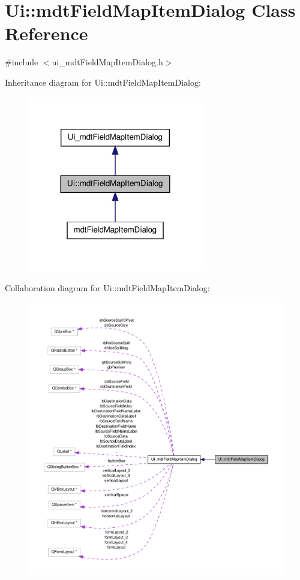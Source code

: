 \hypertarget{class_ui_1_1mdt_field_map_item_dialog}{\section{Ui\-:\-:mdt\-Field\-Map\-Item\-Dialog Class Reference}
\label{class_ui_1_1mdt_field_map_item_dialog}
}


{\ttfamily \#include $<$ui\-\_\-mdt\-Field\-Map\-Item\-Dialog.\-h$>$}



Inheritance diagram for Ui\-:\-:mdt\-Field\-Map\-Item\-Dialog\-:\nopagebreak
\begin{figure}[H]
\begin{center}
\leavevmode
\includegraphics[width=216pt]{class_ui_1_1mdt_field_map_item_dialog__inherit__graph}
\end{center}
\end{figure}


Collaboration diagram for Ui\-:\-:mdt\-Field\-Map\-Item\-Dialog\-:\nopagebreak
\begin{figure}[H]
\begin{center}
\leavevmode
\includegraphics[width=350pt]{class_ui_1_1mdt_field_map_item_dialog__coll__graph}
\end{center}
\end{figure}
